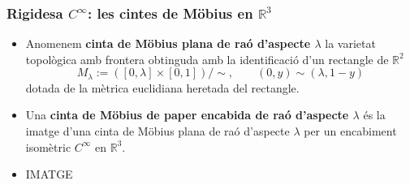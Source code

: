 \documentclass[aspectratio=169]{beamer}
\begin{document}
\begin{frame}
    \frametitle{Rigidesa $C^\infty$: les cintes de Möbius  en $\mathbb{R}^3$}
      \begin{itemize}
          \item<1->     Anomenem \textbf{cinta de Möbius plana de raó d'aspecte $\lambda$} la varietat topològica amb frontera obtinguda amb la identificació d'un rectangle de $\mathbb R^2$
          $$M_\lambda := ([0,\lambda] \times [0,1])/\sim, \quad\quad (0,y)\sim(\lambda,1-y)$$
          dotada de la mètrica euclidiana heretada del rectangle.
          \pause
          \item<2-> Una \textbf{cinta de Möbius de paper encabida de raó d'aspecte $\lambda$} és la imatge d'una cinta de Möbius plana de raó d'aspecte $\lambda$ per un encabiment isomètric $C^\infty$ en $\mathbb R^3$.
          \item<3-> IMATGE
      \end{itemize}
  \end{frame}
\end{document}
